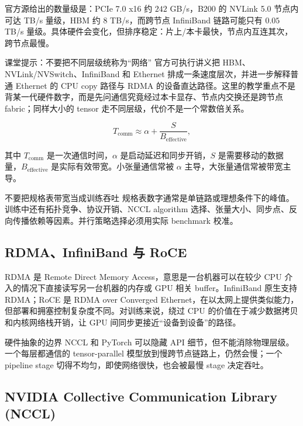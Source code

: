 官方源给出的数量级是：PCIe 7.0 x16 约 \(242\) GB/s，B200 的 NVLink 5.0 节点内可达 TB/s 量级，HBM 约 \(8\) TB/s，而跨节点 InfiniBand 链路可能只有 \(0.05\) TB/s 量级。具体硬件会变化，但排序稳定：片上/本卡最快，节点内互连其次，跨节点最慢。

\begin{knowledgebox}{课堂提示：不要把不同层级统称为“网络”}
官方可执行讲义把 HBM、NVLink/NVSwitch、InfiniBand 和 Ethernet 排成一条速度层次，并进一步解释普通 Ethernet 的 CPU copy 路径与 RDMA 的设备直达路径。这里的教学重点不是背某一代硬件数字，而是先问通信究竟经过本卡显存、节点内交换还是跨节点 fabric；同样大小的 tensor 走不同层级，代价不是一个常数倍关系。
\end{knowledgebox}

\[
T_{\text{comm}} \approx \alpha + \frac{S}{B_{\text{effective}}},
\]

其中 \(T_{\text{comm}}\) 是一次通信时间，\(\alpha\) 是启动延迟和同步开销，\(S\) 是需要移动的数据量，\(B_{\text{effective}}\) 是实际有效带宽。小张量通信常被 \(\alpha\) 主导，大张量通信常被带宽主导。

\begin{warningbox}{不要把规格表带宽当成训练吞吐}
规格表数字通常是单链路或理想条件下的峰值。训练中还有拓扑竞争、协议开销、NCCL algorithm 选择、张量大小、同步点、反向传播依赖等因素。并行策略选择必须用实际 benchmark 校准。
\end{warningbox}

\subsection{RDMA、InfiniBand 与 RoCE}

RDMA 是 Remote Direct Memory Access，意思是一台机器可以在较少 CPU 介入的情况下直接读写另一台机器的内存或 GPU 相关 buffer。InfiniBand 原生支持 RDMA；RoCE 是 RDMA over Converged Ethernet，在以太网上提供类似能力，但部署和拥塞控制复杂度不同。对训练来说，绕过 CPU 的价值在于减少数据拷贝和内核网络栈开销，让 GPU 间同步更接近“设备到设备”的路径。

\begin{importantbox}{硬件抽象的边界}
NCCL 和 PyTorch 可以隐藏 API 细节，但不能消除物理层级。一个每层都通信的 tensor-parallel 模型放到慢跨节点链路上，仍然会慢；一个 pipeline stage 切得不均匀，即使网络很快，也会被最慢 stage 决定吞吐。
\end{importantbox}

\subsection{NVIDIA Collective Communication Library (NCCL)}

